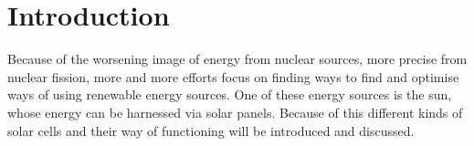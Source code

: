 \section{Introduction}
Because of the worsening image of energy from nuclear sources, more precise from nuclear fission, more and more efforts focus on finding ways to find and optimise ways of using renewable energy sources. \newline 
One of these energy sources is the sun, whose energy can be harnessed via solar panels. Because of this different kinds of solar cells and their way of functioning will be introduced and discussed. 
